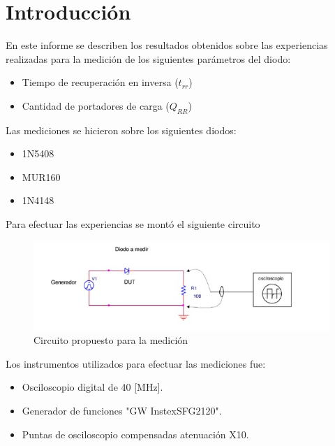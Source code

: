 \documentclass{article}
\begin{document}

\tableofcontents
\clearpage


\section{Introducción}
En este informe se describen los resultados obtenidos sobre las experiencias realizadas para la medición de los siguientes parámetros del diodo:
\begin{itemize}\itemsep0em \itemindent=2em
\item Tiempo de recuperación en inversa ($t_{rr}$) 
\item Cantidad de portadores de carga ($Q_{RR}$)
\end{itemize}

Las mediciones se hicieron sobre los siguientes diodos:
\begin{itemize}\itemsep0em \itemindent=2em
\item 1N5408 
\item MUR160
\item 1N4148
\end{itemize}

Para efectuar las experiencias se montó el siguiente circuito

\begin{figure}[h]
 \begin{center}
	\includegraphics[width=\textwidth]{imagenes/fig1.jpg} 
	\caption{Circuito propuesto para la medición}\label{fig:fig1}
 \end{center}
\end{figure}

Los instrumentos utilizados para efectuar las mediciones fue:
\begin{itemize}\itemsep0em \itemindent=2em
\item Osciloscopio digital de 40 [MHz].
\item Generador de funciones "GW InstexSFG2120".
\item Puntas de osciloscopio compensadas atenuación X10.
\end{itemize}
\end{document}
